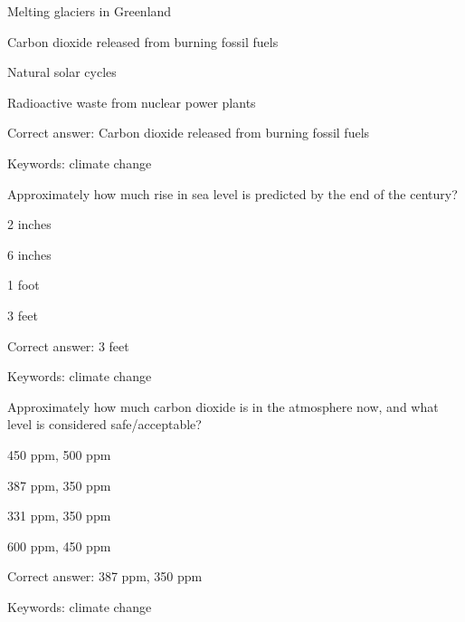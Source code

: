 \begin{answer}
	\item Melting glaciers in Greenland
	\item Carbon dioxide released from burning fossil fuels
	\item Natural solar cycles
	\item Radioactive waste from nuclear power plants
\end{answer}

Correct answer: Carbon dioxide released from burning fossil fuels

Keywords: climate change

\begin{question}
	\item Approximately how much rise in sea level is predicted by the end of the century?
\end{question}

\begin{answer}
	\item 2 inches
	\item 6 inches
	\item 1 foot
	\item 3 feet
\end{answer}

Correct answer: 3 feet

Keywords: climate change

\begin{question}
	\item Approximately how much carbon dioxide is in the atmosphere now, and what level is considered safe/acceptable?
\end{question}

\begin{answer}
	\item 450 ppm, 500 ppm
	\item 387 ppm, 350 ppm
	\item 331 ppm, 350 ppm
	\item 600 ppm, 450 ppm
\end{answer}

Correct answer: 387 ppm, 350 ppm

Keywords: climate change

